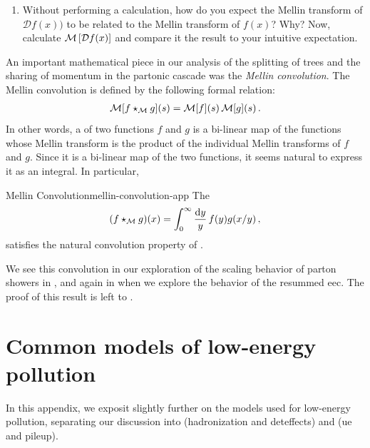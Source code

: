 \begin{subappendices}
\begin{exercise}
\begin{enumerate}[label=\roman*)]
        \item
            Without performing a calculation, how do you expect the Mellin transform of \(\mathcal{D} f(x))\) to be related to the Mellin transform of \(f(x)\)?
            Why?
            Now, calculate \(\mathcal{M}\left[\mathcal{D} f(x)\right]\) and compare it the result to your intuitive expectation.
    \end{enumerate}
\end{exercise}



An important mathematical piece in our analysis of the splitting of trees and the sharing of momentum in the partonic cascade was the \textit{Mellin convolution}.
%
The Mellin convolution is defined by the following formal relation:
\begin{align}
    \label{eq:convolution-property}
    \mathcal{M}[f \mellinconvolution g](s)
    =
    \mathcal{M}[f](s) \, \mathcal{M}[g](s)
    \,.
\end{align}
In other words, a  of two functions \(f\) and \(g\) is a bi-linear map of the functions whose Mellin transform is the product of the individual Mellin transforms of \(f\) and \(g\).
%
Since it is a bi-linear map of the two functions, it seems natural to express it as an integral.
%
In particular,
\begin{proposition}{Mellin Convolution}{mellin-convolution-app}
    The 
    \begin{align}
        (f \star_{\mathcal M} g)(x)
        =
        \int_0^\infty \frac{\dd y}{y}\, f(y) g(x/y)
        \,,
    \end{align}
    satisfies the natural convolution property of .
\end{proposition}
%
We see this convolution in our exploration of the scaling behavior of parton showers in , and again in  when we explore the behavior of the resummed \gls{eec}.
%
The proof of this result is left to .




\section{Common models of low-energy pollution}
\label{app:pollution-models}

In this appendix, we exposit slightly further on the models used for low-energy pollution, separating our discussion into  (\gls{hadronization} and \gls{deteffects}) and  (\gls{ue} and \gls{pileup}).


\end{subappendices}
